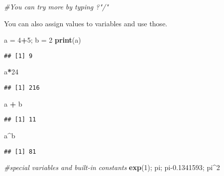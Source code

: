 \documentclass[
]{article}
\newenvironment{Shaded}{\begin{snugshade}}{\end{snugshade}}
\newcommand{\CommentTok}[1]{\textcolor[rgb]{0.56,0.35,0.01}{\textit{#1}}}
\newcommand{\DecValTok}[1]{\textcolor[rgb]{0.00,0.00,0.81}{#1}}
\newcommand{\FloatTok}[1]{\textcolor[rgb]{0.00,0.00,0.81}{#1}}
\newcommand{\FunctionTok}[1]{\textcolor[rgb]{0.13,0.29,0.53}{\textbf{#1}}}
\newcommand{\NormalTok}[1]{#1}
\newcommand{\OtherTok}[1]{\textcolor[rgb]{0.56,0.35,0.01}{#1}}
\newcommand{\SpecialCharTok}[1]{\textcolor[rgb]{0.81,0.36,0.00}{\textbf{#1}}}
\begin{document}
\begin{Shaded}
\begin{Highlighting}[]
\CommentTok{\#You can try more by typing ?"/"}
\end{Highlighting}
\end{Shaded}

You can also assign values to variables and use those.

\begin{Shaded}
\begin{Highlighting}[]
\NormalTok{a }\OtherTok{=} \DecValTok{4}\SpecialCharTok{+}\DecValTok{5}\NormalTok{; b }\OtherTok{=} \DecValTok{2}
\FunctionTok{print}\NormalTok{(a)}
\end{Highlighting}
\end{Shaded}

\begin{verbatim}
## [1] 9
\end{verbatim}

\begin{Shaded}
\begin{Highlighting}[]
\NormalTok{a}\SpecialCharTok{*}\DecValTok{24}
\end{Highlighting}
\end{Shaded}

\begin{verbatim}
## [1] 216
\end{verbatim}

\begin{Shaded}
\begin{Highlighting}[]
\NormalTok{a }\SpecialCharTok{+}\NormalTok{ b}
\end{Highlighting}
\end{Shaded}

\begin{verbatim}
## [1] 11
\end{verbatim}

\begin{Shaded}
\begin{Highlighting}[]
\NormalTok{a}\SpecialCharTok{\^{}}\NormalTok{b}
\end{Highlighting}
\end{Shaded}

\begin{verbatim}
## [1] 81
\end{verbatim}

\begin{Shaded}
\begin{Highlighting}[]
\CommentTok{\#special variables and built{-}in constants}
\FunctionTok{exp}\NormalTok{(}\DecValTok{1}\NormalTok{); pi; pi}\FloatTok{{-}0.1341593}\NormalTok{; pi}\SpecialCharTok{\^{}}\DecValTok{2}
\end{Highlighting}
\end{Shaded}
\end{document}

